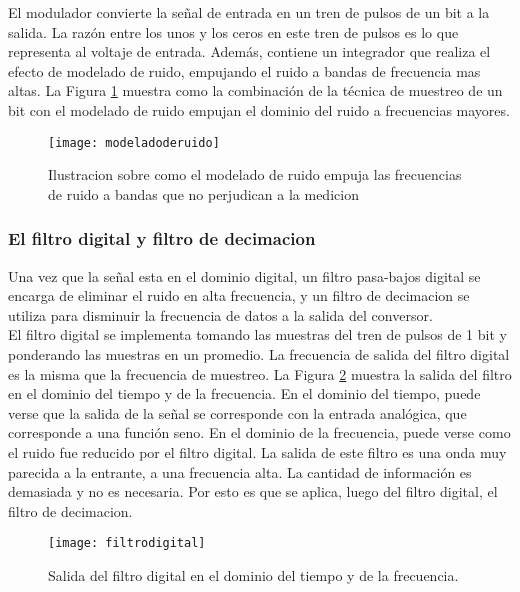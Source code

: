 El modulador convierte la señal de entrada en un tren de pulsos de un bit a la salida. La razón entre los unos y los ceros en este tren de pulsos es lo que representa al voltaje de entrada. Además, contiene un integrador que realiza el efecto de modelado de ruido, empujando el ruido a bandas de frecuencia mas altas. La Figura \ref{fig:modeladoderuido} muestra como la combinación de la técnica de muestreo de un bit con el modelado de ruido empujan el dominio del ruido a frecuencias mayores.\cite{delta_sigma_1}

\begin{figure}[h]
  \centering
  \texttt{[image: modeladoderuido]}
  \caption{Ilustracion sobre como el modelado de ruido empuja las frecuencias de ruido a bandas que no perjudican a la medicion}\label{fig:modeladoderuido}
\end{figure}


\subsubsection{El filtro digital y filtro de decimacion} %
\label{ssub:el_filtro_digital_y_filtro_de_decimacion}

Una vez que la señal esta en el dominio digital, un filtro pasa-bajos digital se encarga de eliminar el ruido en alta frecuencia, y un filtro de decimacion se utiliza para disminuir la frecuencia de datos a la salida del conversor. \\

El filtro digital se implementa tomando las muestras del tren de pulsos de 1 bit y ponderando las muestras en un promedio. La frecuencia de salida del filtro digital es la misma que la frecuencia de muestreo. La Figura \ref{fig:filtrodigital} muestra la salida del filtro en el dominio del tiempo y de la frecuencia. En el dominio del tiempo, puede verse que la salida de la señal se corresponde con la entrada analógica, que corresponde a una función seno. En el dominio de la frecuencia, puede verse como el ruido fue reducido por el filtro digital. La salida de este filtro es una onda muy parecida a la entrante, a una frecuencia alta. La cantidad de información es demasiada y no es necesaria. Por esto es que se aplica, luego del filtro digital, el filtro de decimacion. \\

\begin{figure}[h]
  \centering
  \texttt{[image: filtrodigital]}
  \caption{Salida del filtro digital en el dominio del tiempo y de la frecuencia.}\label{fig:filtrodigital}
\end{figure}

